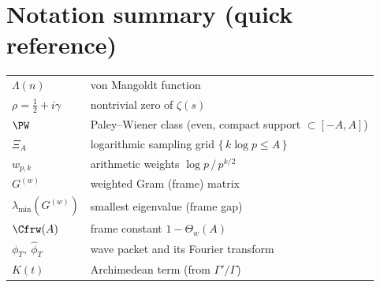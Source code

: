 \section*{Notation summary (quick reference)}
\begin{tabular}{@{}ll@{}}
$\Lambda(n)$ & von Mangoldt function \\[2pt]
$\rho=\tfrac12+i\gamma$ & nontrivial zero of $\zeta(s)$ \\[2pt]
$\PW$ & Paley--Wiener class (even, compact support $\subset[-A,A]$) \\[2pt]
$\Xi_A$ & logarithmic sampling grid $\{\,k\log p\le A\,\}$ \\[2pt]
$w_{p,k}$ & arithmetic weights $\log p\,/\,p^{k/2}$ \\[2pt]
$G^{(w)}$ & weighted Gram (frame) matrix \\[2pt]
$\lambda_{\min}(G^{(w)})$ & smallest eigenvalue (frame gap) \\[2pt]
$\Cfrw(A)$ & frame constant $1-\Theta_w(A)$ \\[2pt]
$\phi_T,\ \hat\phi_T$ & wave packet and its Fourier transform \\[2pt]
$K(t)$ & Archimedean term (from $\Gamma'/\Gamma$)
\end{tabular}
